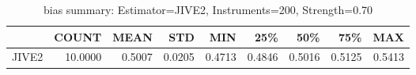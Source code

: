 \begin{table}[ht]
\centering
\caption{bias summary: Estimator=JIVE2, Instruments=200, Strength=0.70}
\begin{tabular}{lrrrrrrrr}
\toprule
 & COUNT & MEAN & STD & MIN & 25\% & 50\% & 75\% & MAX \\
\midrule
JIVE2 & 10.0000 & 0.5007 & 0.0205 & 0.4713 & 0.4846 & 0.5016 & 0.5125 & 0.5413 \\
\bottomrule
\end{tabular}
\end{table}
